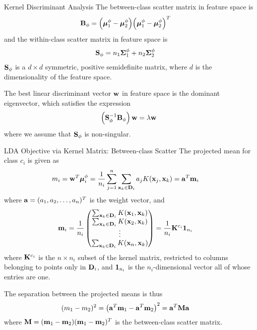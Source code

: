 \begin{frame}{Kernel Discriminant Analysis} 
The between-class scatter matrix in feature space is
\begin{align*}
  \mathbf{B}_\phi & = \Bigl({\bm \mu}_1^\phi - {\bm \mu}_2^\phi\Bigr)
  \Bigl({\bm \mu}_1^\phi - {\bm \mu}_2^\phi\Bigr)^T
\end{align*}
and the within-class scatter matrix in feature space is
\begin{align*}
  \mathbf{S}_\phi &= n_1{\bm \Sigma}_1^\phi + n_2{\bm \Sigma}_2^\phi
\end{align*}
$\mathbf{S}_\phi$ is a $d \times d$ symmetric, positive semidef\/{i}nite
matrix, where $d$ is the dimensionality of the feature space. 

\medskip
The best linear
discriminant vector $\mathbf{w}$ in feature space is the dominant
eigenvector, which satisf\/{i}es the expression
\begin{align*}
  \left(\mathbf{S}_\phi^{-1}\mathbf{B}_\phi\right) \mathbf{w} = \lambda \mathbf{w}
 \label{eq:class:lda:eigeqF}
\end{align*}
where we assume that $\mathbf{S}_\phi$ is non-singular. 
\end{frame}


\begin{frame}{LDA Objective via Kernel Matrix: Between-class Scatter}
\small
The projected mean for class $c_i$ is given as
\begin{align*}
   m_i & = \mathbf{w}^T {\bm \mu}^\phi_i
   = {1 \over n_i} \displaystyle \sum_{j=1}^n \displaystyle \sum_{\mathbf{x}_k \in \mathbf{D}_i} a_{j}
  K(\mathbf{x}_{j},\mathbf{x}_k) = \mathbf{a}^T \mathbf{m}_i 
\end{align*}
where $\mathbf{a} = (a_1, a_2, \ldots, a_n)^T$ is the weight vector, and
\begin{align*}
  \bmm_i & = {1 \over n_i}
  \matr{
      \sum_{\bx_k \in \bD_i} K(\bx_1,\bx_k)\\
      \sum_{\bx_k \in \bD_i} K(\bx_2,\bx_k)\\
      \vdots\\
      \sum_{\bx_k \in \bD_i} K(\bx_n,\bx_k)
      }  = {1\over n_i}\bK^{c_i} \bone_{n_i}
\end{align*}
where $\mathbf{K}^{c_i}$ is the $n \times n_i$ subset of the kernel
matrix, restricted to columns belonging to points only in $\mathbf{D}_i$,
and $\mathbf{1}_{n_i}$ is the $n_i$-dimensional vector all of whose
entries are one. 

\medskip
The separation between the projected means is thus
\begin{align*}
  (m_1 - m_2)^2  & =  \left(\mathbf{a}^T\mathbf{m}_1 - \mathbf{a}^T\mathbf{m}_2\right)^2 
     =  \mathbf{a}^T\mathbf{M}\mathbf{a}
\end{align*}
where $\mathbf{M} = (\mathbf{m}_1 - \mathbf{m}_2)(\mathbf{m}_1-\mathbf{m}_2)^T$ is the
between-class scatter matrix.
\end{frame}


